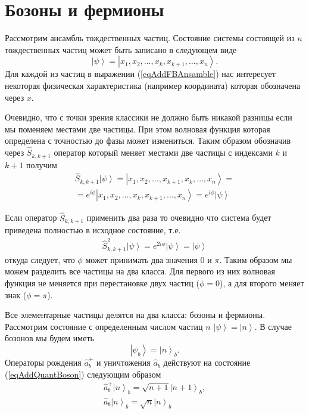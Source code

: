 \section{Бозоны и фермионы}
\label{AddFermionBoson}

Рассмотрим ансамбль тождественных частиц. Состояние системы состоящей
из $n$ тождественных частиц может быть записано в следующем виде
\begin{equation}
  \left|\psi\right> = \left|x_1, x_2, \dots, x_k, x_{k+1}, \dots,
  x_n\right>.
  \label{eqAddFBAnsamble}
\end{equation}
Для каждой из частиц в выражении (\ref{eqAddFBAnsamble}) нас
интересует некоторая физическая характеристика (например координата)
которая обозначена через $x$.

Очевидно, что с точки зрения
классики не должно быть никакой разницы если мы поменяем местами две
частицы. При этом волновая функция которая определена с точностью до
фазы может измениться. Таким образом обозначив через
$\hat{S}_{k,k+1}$ оператор который меняет местами две частицы с
индексами $k$ и $k+1$ получим 
\begin{eqnarray}
  \hat{S}_{k, k+1} \left|\psi\right> = \left|x_1, x_2, \dots, x_{k+1}, x_k, \dots,
  x_n\right> =
  \nonumber \\
  = e^{i \phi} \left|x_1, x_2, \dots, x_k, x_{k+1}, \dots,
  x_n\right> = e^{i \phi} \left|\psi\right>
  \nonumber
\end{eqnarray}

Если оператор $\hat{S}_{k,k+1}$ применить два раза то очевидно что
система будет приведена полностью в исходное состояние, т.е.
\begin{eqnarray}
  \hat{S}_{k, k+1}^2 \left|\psi\right> =
  e^{2 i \phi} \left|\psi\right> = \left|\psi\right>
  \nonumber
\end{eqnarray}
откуда следует, что $\phi$ может принимать два значения $0$ и $\pi$.
Таким образом мы можем разделить все частицы на два класса. Для
первого из них волновая функция не меняется при перестановке двух
частиц ($\phi = 0$), а для второго меняет знак ($\phi = \pi$).


Все элементарные частицы делятся на два класса: бозоны и
фермионы. Рассмотрим состояние с определенным числом частиц $n$
$\left|\psi\right> = \left|n\right>$. В случае бозонов мы будем иметь 
\begin{equation}
\left|\psi_b\right> = \left|n\right>_b.
\label{eqAddQuantBoson}
\end{equation}
Операторы рождения $\hat{a}_b^{+}$ и уничтожения $\hat{a}_b$ действуют на
состояние (\ref{eqAddQuantBoson}) следующим образом
\begin{eqnarray}
\hat{a}_b^{+}\left|n\right>_b = \sqrt{n+1}\left|n+1\right>_b, 
\nonumber \\
\hat{a}_b\left|n\right>_b = \sqrt{n}\left|n\right>_b
\nonumber
\end{eqnarray}


